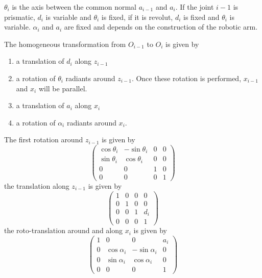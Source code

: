 \documentclass[10pt, letterpaper]{report}
\begin{document}
$\theta_i$ is the axis between the common normal $a_{i-1}$ and $a_i$. If the joint $i-1$ is prismatic, $d_i$ is variable and $\theta_i$ is fixed, if it is revolut, $d_i$ is fixed and $\theta_i$ is variable. $\alpha_i$ and $a_i$ are fixed and depends on the construction of the robotic arm. \bigskip 

\noindent The homogeneous transformation from $O_{i-1}$ to $O_i$ is given by\begin{enumerate}
    \item a translation of $d_i$ along $z_{i-1}$
    \item a rotation of $\theta_i$ radiants around $z_{i-1}$. Once these rotation is performed, $x_{i-1}$ and $x_i$ will be parallel. 
    \item a translation of $a_i$ along $x_i$ 
    \item a rotation of $\alpha_i$ radiants around $x_{i}$.
\end{enumerate}
The first rotation around $z_{i-1}$ is given by\begin{equation}
    \begin{pmatrix}
        \cos\theta_i&-\sin\theta_i&0&0\\ 
        \sin\theta_i&\cos\theta_i&0&0\\ 
        0&0&1&0\\ 
        0&0&0&1
    \end{pmatrix}
\end{equation}
the translation along $z_{i-1}$ is given by \begin{equation}
    \begin{pmatrix}
        1&0&0&0\\ 
        0&1&0&0\\ 
        0&0&1&d_i\\ 
        0&0&0&1
    \end{pmatrix}
\end{equation}
the roto-translation around and along $x_i$ is given by\begin{equation}
    \begin{pmatrix}
       1&0&0&a_i\\ 
       0&\cos\alpha_i&-\sin\alpha_i&0\\ 
        0&\sin\alpha_i&\cos\alpha_i&0\\ 
        0&0&0&1
    \end{pmatrix}
\end{equation}
\end{document}
